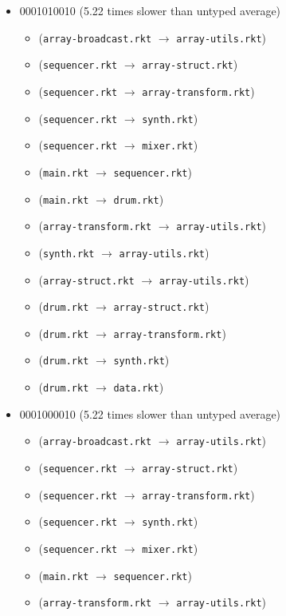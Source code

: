 \documentclass{article}
\newcommand{\mono}[1]{\texttt{#1}}
\begin{document}
\begin{itemize}
\begin{itemize}
  \end{itemize}
\item 0001010010 (5.22 times slower than untyped average)
  \begin{itemize}
  \item (\mono{array-broadcast.rkt} $\rightarrow$ \mono{array-utils.rkt})
  \item (\mono{sequencer.rkt} $\rightarrow$ \mono{array-struct.rkt})
  \item (\mono{sequencer.rkt} $\rightarrow$ \mono{array-transform.rkt})
  \item (\mono{sequencer.rkt} $\rightarrow$ \mono{synth.rkt})
  \item (\mono{sequencer.rkt} $\rightarrow$ \mono{mixer.rkt})
  \item (\mono{main.rkt} $\rightarrow$ \mono{sequencer.rkt})
  \item (\mono{main.rkt} $\rightarrow$ \mono{drum.rkt})
  \item (\mono{array-transform.rkt} $\rightarrow$ \mono{array-utils.rkt})
  \item (\mono{synth.rkt} $\rightarrow$ \mono{array-utils.rkt})
  \item (\mono{array-struct.rkt} $\rightarrow$ \mono{array-utils.rkt})
  \item (\mono{drum.rkt} $\rightarrow$ \mono{array-struct.rkt})
  \item (\mono{drum.rkt} $\rightarrow$ \mono{array-transform.rkt})
  \item (\mono{drum.rkt} $\rightarrow$ \mono{synth.rkt})
  \item (\mono{drum.rkt} $\rightarrow$ \mono{data.rkt})
  \end{itemize}
\item 0001000010 (5.22 times slower than untyped average)
  \begin{itemize}
  \item (\mono{array-broadcast.rkt} $\rightarrow$ \mono{array-utils.rkt})
  \item (\mono{sequencer.rkt} $\rightarrow$ \mono{array-struct.rkt})
  \item (\mono{sequencer.rkt} $\rightarrow$ \mono{array-transform.rkt})
  \item (\mono{sequencer.rkt} $\rightarrow$ \mono{synth.rkt})
  \item (\mono{sequencer.rkt} $\rightarrow$ \mono{mixer.rkt})
  \item (\mono{main.rkt} $\rightarrow$ \mono{sequencer.rkt})
  \item (\mono{array-transform.rkt} $\rightarrow$ \mono{array-utils.rkt})

\end{itemize}
\end{itemize}
\end{document}
